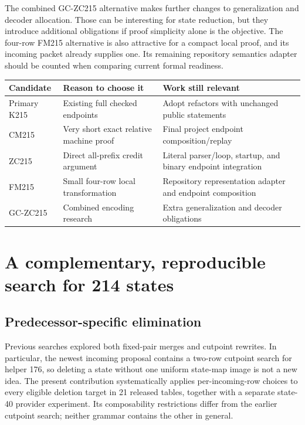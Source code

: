 \documentclass[11pt]{article}
\theoremstyle{definition}\newtheorem{definition}[theorem]{Definition}
\begin{document}
The combined GC-ZC215 alternative makes further changes to generalization and
decoder allocation. Those can be interesting for state reduction, but they
introduce additional obligations if proof simplicity alone is the objective.
The four-row FM215 alternative is also attractive for a compact local proof,
and its incoming packet already supplies one. Its remaining repository
semantics adapter should be counted when comparing current formal readiness.

\begin{center}
\begin{tabular}{L{.18\textwidth}L{.35\textwidth}L{.37\textwidth}}
\toprule
Candidate & Reason to choose it & Work still relevant\\
\midrule
Primary K215 & Existing full checked endpoints & Adopt refactors with unchanged
public statements\\
CM215 & Very short exact relative machine proof & Final project endpoint
composition/replay\\
ZC215 & Direct all-prefix credit argument & Literal parser/loop, startup, and
binary endpoint integration\\
FM215 & Small four-row local transformation & Repository representation
adapter and endpoint composition\\
GC-ZC215 & Combined encoding research & Extra generalization and decoder
obligations\\
\bottomrule
\end{tabular}
\end{center}

\section{A complementary, reproducible search for 214 states}

\subsection{Predecessor-specific elimination}

Previous searches explored both fixed-pair merges and cutpoint rewrites. In
particular, the newest incoming proposal contains a two-row cutpoint search
for helper 176, so deleting a state without one uniform state-map image is
not a new idea. The present contribution systematically applies per-incoming-row
choices to every eligible deletion target in 21 released tables, together with
a separate state-40 provider experiment. Its composability restrictions differ
from the earlier cutpoint search; neither grammar contains the other in general.
\end{document}
